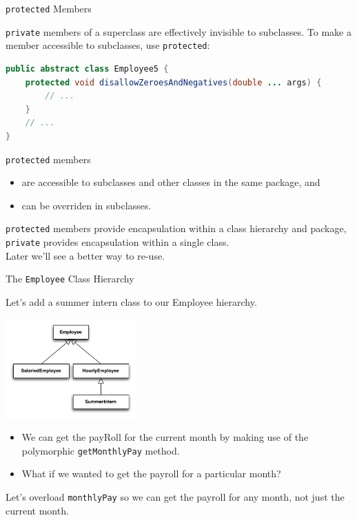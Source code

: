 \documentclass{beamer}
\begin{document}


\begin{frame}[fragile]{{\tt protected} Members}


{\tt private} members of a superclass are effectively invisible to subclasses.  To make a member accessible to subclasses, use {\tt protected}:
\begin{lstlisting}[language=Java]
public abstract class Employee5 {
    protected void disallowZeroesAndNegatives(double ... args) {
        // ...
    }
    // ...
}
\end{lstlisting}
{\tt protected} members
\begin{itemize}
\item are accessible to subclasses and other classes in the same package, and
\item can be overriden in subclasses.
\end{itemize}
{\tt protected} members provide encapsulation within a class hierarchy and package, {\tt private} provides encapsulation within a single class.\\
\vspace{.05in}
Later we'll see a better way to re-use.
\end{frame}

\begin{frame}[fragile]{The {\tt Employee} Class Hierarchy}

Let's add a summer intern class to our Employee hierarchy.
\vspace{-.1in}
\begin{center}
\includegraphics[height=1.5in]{expanded-employee-class-hierarchy.pdf}
\end{center}

\begin{itemize}
\item We can get the payRoll for the current month by making use of the polymorphic {\tt getMonthlyPay} method.
\item What if we wanted to get the payroll for a particular month?
\end{itemize}

Let's overload {\tt monthlyPay} so we can get the payroll for any month, not just the current month.

\end{frame}
\end{document}
